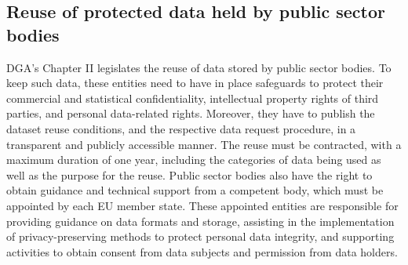 
\subsection{Reuse of protected data held by public sector bodies}
\label{sec:reuse}

DGA's Chapter II legislates the reuse of data stored by public sector bodies.
To keep such data, these entities need to have in place safeguards to protect their commercial and statistical confidentiality, intellectual property rights of third parties, and personal data-related rights.
Moreover, they have to publish the dataset reuse conditions, and the respective data request procedure, in a transparent and publicly accessible manner.
The reuse must be contracted, with a maximum duration of one year, including the categories of data being used as well as the purpose for the reuse. 
Public sector bodies also have the right to obtain guidance and technical support from a competent body, which must be appointed by each EU member state.
These appointed entities are responsible for providing guidance on data formats and storage, assisting in the implementation of privacy-preserving methods to protect personal data integrity, and supporting activities to obtain consent from data subjects and permission from data holders.

